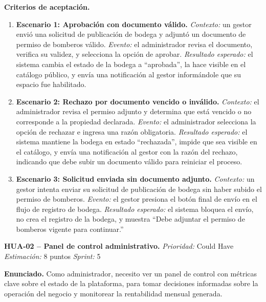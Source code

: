 \textbf{Criterios de aceptación.}
\begin{enumerate}
\item \textbf{Escenario 1: Aprobación con documento válido.} \textit{Contexto:} un gestor envió una solicitud de publicación de bodega y adjuntó un documento de permiso de bomberos válido. \textit{Evento:} el administrador revisa el documento, verifica su validez, y selecciona la opción de aprobar. \textit{Resultado esperado:} el sistema cambia el estado de la bodega a ``aprobada'', la hace visible en el catálogo público, y envía una notificación al gestor informándole que su espacio fue habilitado.
\item \textbf{Escenario 2: Rechazo por documento vencido o inválido.} \textit{Contexto:} el administrador revisa el permiso adjunto y determina que está vencido o no corresponde a la propiedad declarada. \textit{Evento:} el administrador selecciona la opción de rechazar e ingresa una razón obligatoria. \textit{Resultado esperado:} el sistema mantiene la bodega en estado ``rechazada'', impide que sea visible en el catálogo, y envía una notificación al gestor con la razón del rechazo, indicando que debe subir un documento válido para reiniciar el proceso.
\item \textbf{Escenario 3: Solicitud enviada sin documento adjunto.} \textit{Contexto:} un gestor intenta enviar su solicitud de publicación de bodega sin haber subido el permiso de bomberos. \textit{Evento:} el gestor presiona el botón final de envío en el flujo de registro de bodega. \textit{Resultado esperado:} el sistema bloquea el envío, no crea el registro de la bodega, y muestra ``Debe adjuntar el permiso de bomberos vigente para continuar.''
\end{enumerate}

\textbf{HUA-02 -- Panel de control administrativo.} \label{req:HUA-02}
\textit{Prioridad:} Could Have \quad \textit{Estimación:} 8 puntos \quad \textit{Sprint:} 5

\textbf{Enunciado.} Como administrador, necesito ver un panel de control con métricas clave sobre el estado de la plataforma, para tomar decisiones informadas sobre la operación del negocio y monitorear la rentabilidad mensual generada.

